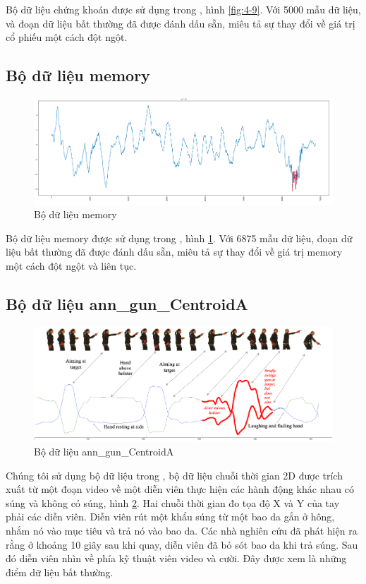 Bộ dữ liệu chứng khoán được sử dụng trong \cite{st30}, hình \ref{fig:4-9}. Với 5000 mẫu dữ liệu, và đoạn dữ liệu bất thường đã được đánh dấu sẵn, miêu tả sự thay đổi về giá trị cổ phiếu một cách đột ngột.

\subsection{Bộ dữ liệu memory}
\begin{figure}[H]
    \centering
    \includegraphics[scale=0.75]{./content/images/4-10.png}
    \caption{Bộ dữ liệu memory}
    \label{fig:4-10}
\end{figure}

Bộ dữ liệu memory được sử dụng trong \cite{st30}, hình \ref{fig:4-10}. Với 6875 mẫu dữ liệu, đoạn dữ liệu bất thường đã được đánh dấu sẵn, miêu tả sự thay đổi về giá trị memory một cách đột ngột và liên tục.

\subsection{Bộ dữ liệu ann\_gun\_CentroidA}
\begin{figure}[H]
    \centering
    \includegraphics[scale=1]{./content/images/4-11.png}
    \caption{Bộ dữ liệu ann\_gun\_CentroidA}
    \label{fig:4-11}
\end{figure}

Chúng tôi sử dụng bộ dữ liệu trong \cite{st12}, bộ dữ liệu chuỗi thời gian 2D được trích xuất từ một đoạn video về một diễn viên thực hiện các hành động khác nhau có súng và không có súng, hình \ref{fig:4-11}. Hai chuỗi thời gian đo tọa độ X và Y của tay phải các diễn viên. Diễn viên rút một khẩu súng từ một bao da gắn ở hông, nhắm nó vào mục tiêu và trả nó vào bao da. Các nhà nghiên cứu đã phát hiện ra rằng ở khoảng 10 giây sau khi quay, diễn viên đã bỏ sót bao da khi trả súng. Sau đó diễn viên nhìn về phía kỹ thuật viên video và cười. Đây được xem là những điểm dữ liệu bất thường.

